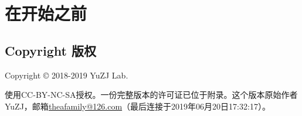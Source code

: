 \chapter{在开始之前}
\section{Copyright 版权}
Copyright \copyright{} 2018-2019 YuZJ Lab. \par
使用CC-BY-NC-SA授权。一份完整版本的许可证已位于附录。这个版本原始作者YuZJ，邮箱\url{theafamily@126.com}（最后连接于2019年06月20日17:32:17）。
\begin{center}\large \bf {\color{red}{对本文档所引起的任何后果不作担保！}}\normalall\end{center}
